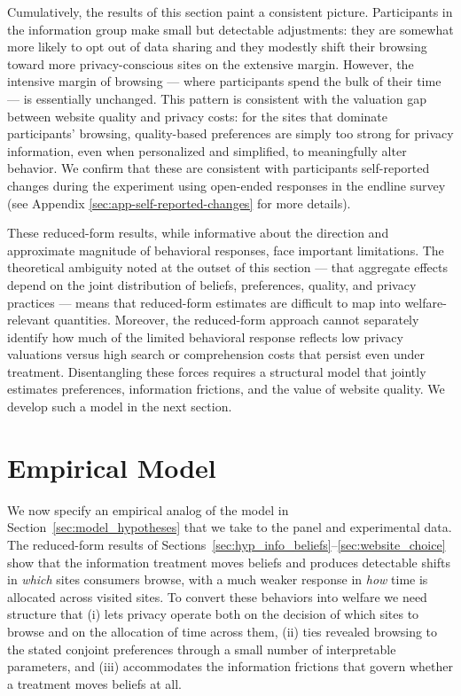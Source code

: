 \documentclass[12pt]{article}
\theoremstyle{definition}
\theoremstyle{remark}
\begin{document}
\noindent Cumulatively, the results of this section paint a consistent picture. Participants in the information group make small but detectable adjustments: they are somewhat more likely to opt out of data sharing and they modestly shift their browsing toward more privacy-conscious sites on the extensive margin. However, the intensive margin of browsing --- where participants spend the bulk of their time --- is essentially unchanged. This pattern is consistent with the valuation gap between website quality and privacy costs: for the sites that dominate participants' browsing, quality-based preferences are simply too strong for privacy information, even when personalized and simplified, to meaningfully alter behavior. We confirm that these are consistent with participants self-reported changes during the experiment using open-ended responses in the endline survey (see Appendix \ref{sec:app-self-reported-changes} for more details).
 
These reduced-form results, while informative about the direction and approximate magnitude of behavioral responses, face important limitations. The theoretical ambiguity noted at the outset of this section --- that aggregate effects depend on the joint distribution of beliefs, preferences, quality, and privacy practices --- means that reduced-form estimates are difficult to map into welfare-relevant quantities. Moreover, the reduced-form approach cannot separately identify how much of the limited behavioral response reflects low privacy valuations versus high search or comprehension costs that persist even under treatment. Disentangling these forces requires a structural model that jointly estimates preferences, information frictions, and the value of website quality. We develop such a model in the next section.

\section{Empirical Model}\label{sec:empirical_model}

We now specify an empirical analog of the model in Section~\ref{sec:model_hypotheses} that we take to the panel and experimental data. The reduced-form results of Sections~\ref{sec:hyp_info_beliefs}--\ref{sec:website_choice} show that the information treatment moves beliefs and produces detectable shifts in \emph{which} sites consumers browse, with a much weaker response in \emph{how} time is allocated across visited sites. To convert these behaviors into welfare we need structure that (i) lets privacy operate both on the decision of which sites to browse and on the allocation of time across them, (ii) ties revealed browsing to the stated conjoint preferences through a small number of interpretable parameters, and (iii) accommodates the information frictions that govern whether a treatment moves beliefs at all.
\end{document}
